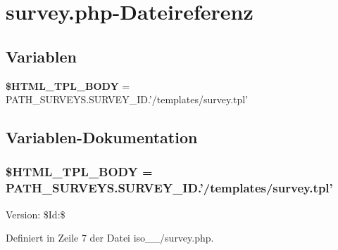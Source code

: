 \section{survey.php-Dateireferenz}
\label{iso__9241__10_2survey_8php}
\subsection*{Variablen}
\begin{CompactItemize}
\item 
{\bf \$HTML\_\-TPL\_\-BODY} = PATH\_\-SURVEYS.SURVEY\_\-ID.'/templates/survey.tpl'
\end{CompactItemize}


\subsection{Variablen-Dokumentation}
\subsubsection{\setlength{\rightskip}{0pt plus 5cm}\$HTML\_\-TPL\_\-BODY = PATH\_\-SURVEYS.SURVEY\_\-ID.'/templates/survey.tpl'}\label{iso__9241__10_2survey_8php_132a7bf90078fd9ad70b6057c8c2682a}


\begin{Desc}
\item[Version:]\$Id:\$ \end{Desc}


Definiert in Zeile 7 der Datei iso\_\_/survey.php.